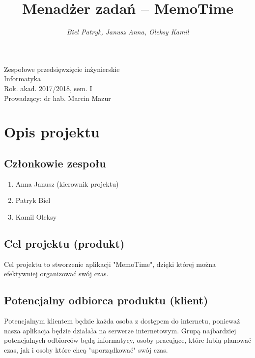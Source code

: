 ﻿\documentclass[a4paper]{article}
\title{\bf{Menadżer zadań -- MemoTime}}
\author{{\em Biel Patryk, Janusz Anna, Oleksy Kamil}}
\date{}
\begin{document}
\begin{titlepage}
\maketitle
\thispagestyle{empty}
\bigskip
\begin{center}
Zespołowe przedsięwzięcie inżynierskie\\[2mm]

Informatyka\\[2mm]

Rok. akad. 2017/2018, sem. I\\[2mm]

Prowadzący: dr hab. Marcin Mazur
\end{center}
\end{titlepage}

\tableofcontents
\thispagestyle{empty}

\newpage

\section{Opis projektu}
\label{sec:OpisProjektu}

\subsection{Członkowie zespołu}
\label{subsec:CzlonkowieZespolu}

\begin{enumerate}
\item Anna Janusz (kierownik projektu)
\item Patryk Biel
\item Kamil Oleksy
\end{enumerate}

\subsection{Cel projektu (produkt)}
\label{subsec:CelProjektu}

Cel projektu to stworzenie aplikacji "MemoTime", dzięki której można efektywniej organizować swój czas. 

\subsection{Potencjalny odbiorca produktu (klient)}
\label{subsec:PotencjalnyOdbiorcaProduktu}

Potencjalnym klientem będzie każda osoba z  dostępem do internetu, ponieważ nasza aplikacja będzie działała na serwerze internetowym. Grupą najbardziej potencjalnych odbiorców będą informatycy, osoby pracujące, które lubią planować czas, jak i osoby które chcą "uporządkować" swój czas.
\end{document}
